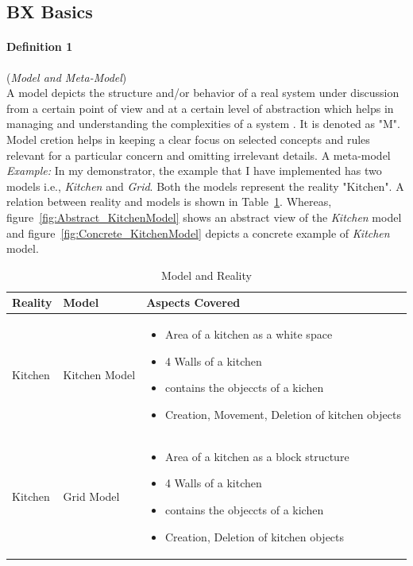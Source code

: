 \subsection{BX Basics}\label{subsec:definitions}
\paragraph{Definition 1} (\textit{Model and Meta-Model})\\
A model depicts the structure and/or behavior of a real system under discussion from a certain point of view and at a certain level of abstraction which helps in managing and understanding the complexities of a system \cite{uml} \cite{mdsd}. It is denoted as "M". Model cretion helps in keeping a clear focus on selected concepts and rules relevant for a particular concern and omitting irrelevant details.
\newline\newline A meta-model 
\newline\newline \textit{Example:} In my demonstrator, the example that I have implemented has two models i.e., \textit{Kitchen} and \textit{Grid}. Both the models represent the reality "Kitchen". A relation between reality and models is shown in Table~\ref{tab:Model_Reality}. Whereas, figure~\ref{fig:Abstract_KitchenModel} shows an abstract view of the \textit{Kitchen} model and figure~\ref{fig:Concrete_KitchenModel} depicts a concrete example of \textit{Kitchen} model.

\begin{table}
	\centering	
	\begin{tabular}{|p{3cm}|p{3cm}|p{9cm}|}
		\hline
		\rowcolor[gray]{.8}	
		\textbf{Reality} & \textbf{Model} & \textbf{Aspects Covered} \\
		\hline
		Kitchen & Kitchen Model & 
		\begin{itemize}
			\item Area of a kitchen as a white space
			\item 4 Walls of a kitchen
			\item contains the objeccts of a kichen
			\item Creation, Movement, Deletion of kitchen objects
		\end{itemize}\\
		\hline
		Kitchen & Grid Model & 
		\begin{itemize}
			\item Area of a kitchen as a block structure
			\item 4 Walls of a kitchen
			\item contains the objeccts of a kichen
			\item Creation, Deletion of kitchen objects
		\end{itemize}\\
		\hline					
		
	\end{tabular}
	\label{tab:Model_Reality}
	\caption{Model and Reality}
\end{table}

